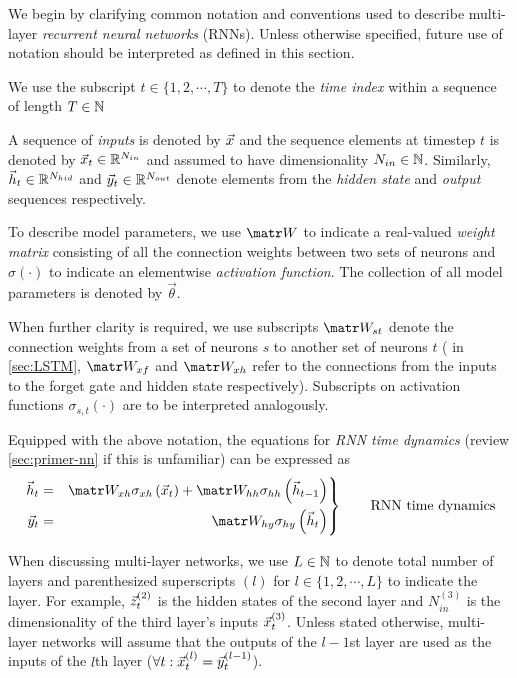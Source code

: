 We begin by clarifying common notation and conventions used to describe
multi-layer \emph{recurrent neural networks} (RNNs). Unless otherwise
specified, future use of notation should be interpreted as defined in this
section.

We use the subscript $t \in \{ 1,2,\cdots,T \}$ to denote the \emph{time index}
within a sequence of length $T \in \mathbb{N}$

A sequence of \emph{inputs} is denoted by $\vec{x}$ and the sequence elements at timestep $t$ is
denoted by $\vec{x}_t \in \mathbb{R}^{N_{in}}$ and assumed to have dimensionality $N_{in} \in \mathbb{N}$.
Similarly, $\vec{h}_t \in \mathbb{R}^{N_{hid}}$ and $\vec{y}_t \in \mathbb{R}^{N_{out}}$ denote elements
from the \emph{hidden state} and \emph{output} sequences respectively.

To describe model parameters, we use $\W$ to indicate a real-valued
\emph{weight matrix} consisting of all the connection weights between two sets
of neurons and $\sigma(\cdot)$ to indicate an elementwise \emph{activation
function}. The collection of all model parameters is denoted by $\vec{\theta}$.

When further clarity is required, we use subscripts $\W_{st}$ denote the
connection weights from a set of neurons $s$ to another set of neurons $t$ (\ie
in \vref{sec:LSTM}, $\W_{xf}$ and $\W_{xh}$ refer to the connections from the
inputs to the forget gate and hidden state respectively). Subscripts on
activation functions $\sigma_{s,t}(\cdot)$ are to be interpreted analogously.

Equipped with the above notation, the equations for \emph{RNN time dynamics} (review
\vref{sec:primer-nn} if this is unfamiliar) can be expressed as
\begin{equation}\label{eq:rnn-dynamics}
 \left.\begin{aligned}
          \h_t &=& \W_{xh} \sigma_{xh} \left( \x_t \right) + \W_{hh} \sigma_{hh} \left( \h_{t-1} \right)\\
          \y_t &=& \W_{hy} \sigma_{hy} \left( \h_t \right)
       \end{aligned}
 \right\}
 \qquad \text{RNN time dynamics}
\end{equation}

When discussing multi-layer networks, we use $L \in \mathbb{N}$ to denote total number
of layers and parenthesized superscripts $(l)$ for $l \in \{1,2,\cdots,L\}$ to
indicate the layer. For example, $\vec{z}^{(2)}_t$ is the hidden states of the
second layer and $N^{(3)}_{in}$ is the dimensionality of the third layer's
inputs $\vec{x}^{(3)}_t$. Unless stated otherwise, multi-layer networks will assume
that the outputs of the $l-1$st layer are used as the inputs of the $l$th layer
(\ie $\forall t: \vec{x}^{(l)}_t = \vec{y}^{(l-1)}_t$).

